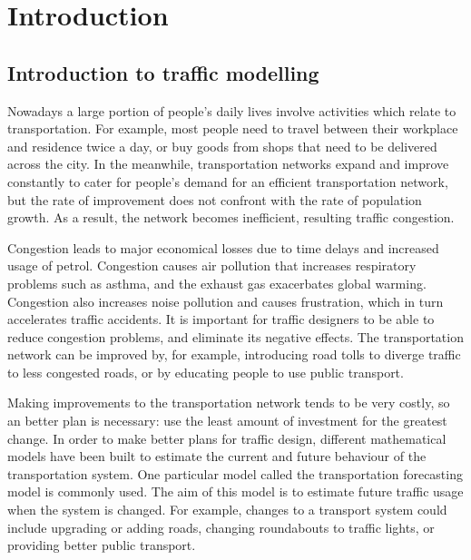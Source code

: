 \chapter{Introduction}


\section{Introduction to traffic modelling}
Nowadays a large portion of people's daily lives involve activities which relate to transportation.
For example, most people need to travel between their workplace and residence twice a day,
or buy goods from shops that need to be delivered across the city.
In the meanwhile, 
transportation networks expand and improve constantly to cater for people's demand for an efficient transportation network,
but the rate of improvement does not confront with the rate of population growth.
As a result,
the network becomes inefficient, resulting traffic congestion.

Congestion leads to major economical losses due to time delays and increased usage of petrol.
Congestion causes air pollution that increases respiratory problems such as asthma, 
and the exhaust gas exacerbates global warming.
Congestion also increases noise pollution and causes frustration,
which in turn accelerates traffic accidents.
It is important for traffic designers to be able to reduce congestion problems,
and eliminate its negative effects.
The transportation network can be improved by, for example,
introducing road tolls to diverge traffic to less congested roads,
or by educating people to use public transport.

Making improvements to the transportation network tends to be very costly,
so an better plan is necessary:
use the least amount of investment for the greatest change.
In order to make better plans for traffic design,
different mathematical models have been built to estimate the current and future behaviour of the transportation system.
One particular model called the transportation forecasting model is commonly used.
The aim of this model is to estimate future traffic usage when the system is changed.
For example, changes to a transport system could include upgrading or adding roads, changing roundabouts to traffic lights, or providing better public transport. 


